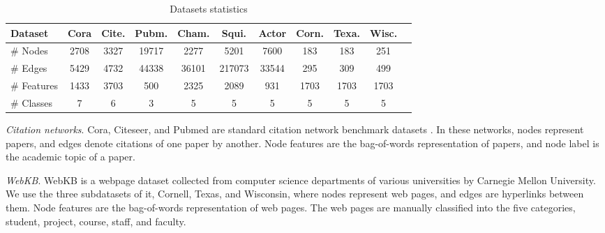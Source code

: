 \documentclass{article} \usepackage{iclr2020_conference,times}
\begin{document}
\begin{table*}[!hbtp]
\centering
\caption{Datasets statistics}
\vspace{-1mm}
\label{tab:stat}
\begin{tabular}{lcccccccccc}
\toprule
  \multicolumn{1}{l}{\textbf{Dataset}}               &Cora                          & Cite.                    & Pubm.                   & Cham.           & Squi.           & Actor          & Corn.           & Texa.                    & Wisc.           \\
\midrule
\# Nodes                         & 2708                   & 3327                   & 19717           & 2277           & 5201          & 7600           & 183           & 183              & 251        \\
\# Edges                         & 5429                    & 4732                   & 44338           & 36101           & 217073          & 33544           & 295           & 309                & 499     \\
\# Features                         & 1433                    & 3703                   & 500           & 2325           & 2089          & 931           & 1703           & 1703               & 1703      \\
\# Classes                         & 7                    & 6                   & 3           & 5           & 5          &5           & 5           & 5                   & 5      \\
\bottomrule
\end{tabular}
\vspace{-1mm}
\end{table*}

\emph{Citation networks}. Cora, Citeseer, and Pubmed are standard citation network benchmark datasets \citep{sen2008collective,namata2012query}.
In these networks, nodes represent papers, and edges denote citations of one paper by another. 
Node features are the bag-of-words representation of papers, and node label is the academic topic of a paper.

\emph{WebKB}. WebKB is a webpage dataset collected from computer science departments of various universities by Carnegie Mellon University.
We use the three subdatasets of it, Cornell, Texas, and Wisconsin, where nodes represent web pages, and edges are hyperlinks between them.
Node features are the bag-of-words representation of web pages.
The web pages are manually classified into the five categories, student, project, course, staff, and faculty.
\end{document}
